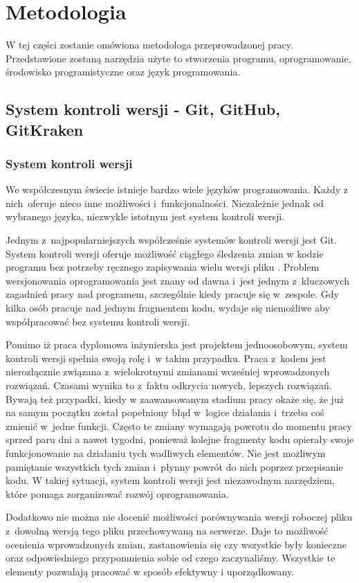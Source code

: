 \documentclass[eng,printmode]{mgr}
\begin{document}
\chapter{Metodologia}
W tej części zostanie omówiona metodologa przeprowadzonej pracy. Przedstawione zostaną narzędzia użyte to stworzenia programu, oprogramowanie, środowisko programistyczne oraz język programowania.
\section{System kontroli wersji - Git, GitHub, GitKraken}
\subsection{System kontroli wersji}
We współczesnym świecie istnieje bardzo wiele języków programowania. Każdy z nich~oferuje nieco inne możliwości i~funkcjonalności. Niezależnie jednak od wybranego języka, niezwykle istotnym jest system kontroli wersji. 

Jednym z~najpopularniejszych współcześnie systemów kontroli wersji jest Git. System kontroli wersji oferuje możliwość ciągłego śledzenia zmian w kodzie programu bez potrzeby ręcznego zapisywania wielu wersji pliku \cite{Git}. Problem wersjonowania oprogramowania jest znany od dawna i~jest jednym z~kluczowych zagadnień pracy nad programem, szczególnie kiedy pracuje się w~zespole. Gdy kilka osób pracuje nad jednym fragmentem kodu, wydaje się niemożliwe aby współpracować bez systemu kontroli wersji.

Pomimo iż praca dyplomowa inżynierska jest projektem jednoosobowym, system kontroli wersji spełnia swoją rolę i~w takim przypadku. Praca z~kodem jest nierozłącznie związana z~wielokrotnymi zmianami wcześniej wprowadzonych rozwiązań. Czasami wynika to z~faktu odkrycia nowych, lepszych rozwiązań. Bywają też przypadki, kiedy w zaawansowanym stadium pracy okaże się, że już na samym początku został popełniony błąd w~logice działania i~trzeba coś zmienić w~jedne funkcji. Często te zmiany wymagają powrotu do momentu pracy sprzed paru dni a nawet tygodni, ponieważ kolejne fragmenty kodu opierały swoje funkcjonowanie na działaniu tych wadliwych elementów. Nie jest możliwym pamiętanie wszystkich tych zmian i~płynny powrót do nich poprzez przepisanie kodu. W takiej sytuacji, system kontroli wersji jest niezawodnym narzędziem, które pomaga zorganizować rozwój oprogramowania. 

Dodatkowo nie można nie docenić możliwości porównywania wersji roboczej pliku z~dowolną wersją tego pliku przechowywaną na serwerze. Daje to możliwość ocenienia wprowadzonych zmian, zastanowienia się czy wszystkie były konieczne oraz odpowiedniego przypomnienia sobie od czego zaczynaliśmy. Wszystkie te elementy pozwalają pracować w sposób efektywny i uporządkowany.
\end{document}

